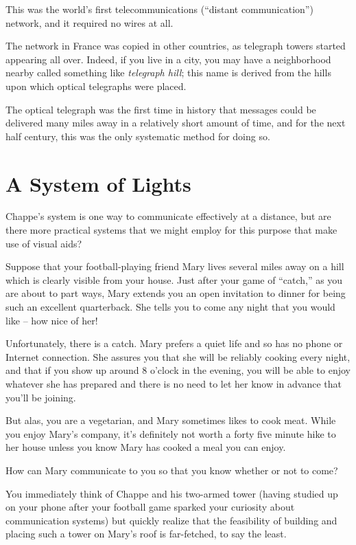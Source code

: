 \documentclass{book}
\begin{document}
This was the world's first telecommunications (``distant communication'') network, and it required no wires at all. 

The network in France was copied in other countries, as telegraph towers started appearing all over. Indeed, if you live in a city, you may have a neighborhood nearby called something like \emph{telegraph hill}; this name is derived from the hills upon which optical telegraphs were placed. 

The optical telegraph was the first time in history that messages could be delivered many miles away in a relatively short amount of time, and for the next half century, this was the only systematic method for doing so.

\section{A System of Lights}

Chappe's system is one way to communicate effectively at a distance, but are there more practical systems that we might employ for this purpose that make use of visual aids?

Suppose that your football-playing friend Mary lives several miles away on a hill which is clearly visible from your house. Just after your game of ``catch,'' as you are about to part ways, Mary extends you an open invitation to dinner for being such an excellent quarterback. She tells you to come any night that you would like -- how nice of her!

Unfortunately, there is a catch. Mary prefers a quiet life and so has no phone or Internet connection. She assures you that she will be reliably cooking every night, and that if you show up around 8 o'clock in the evening, you will be able to enjoy whatever she has prepared and there is no need to let her know in advance that you'll be joining.

But alas, you are a vegetarian, and Mary sometimes likes to cook meat. While you enjoy Mary's company, it's definitely not worth a forty five minute hike to her house unless you know Mary has cooked a meal you can enjoy.

How can Mary communicate to you so that you know whether or not to come?

You immediately think of Chappe and his two-armed tower (having studied up on your phone after your football game sparked your curiosity about communication systems) but quickly realize that the feasibility of building and placing such a tower on Mary's roof is far-fetched, to say the least.
\end{document}
